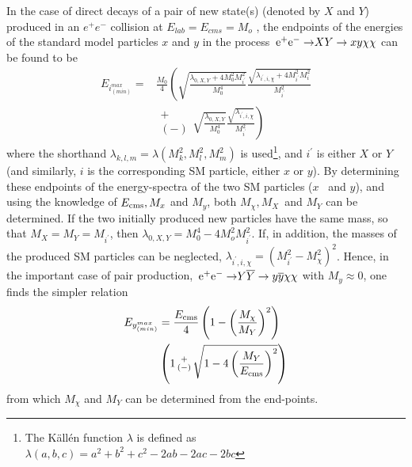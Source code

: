 In the case of direct decays of a pair of new state(s) (denoted by
$X$ and $Y$) produced
in an $e^+e^-$ collision at $E_{lab} = E_{cms} = M_o$ , 
the endpoints
of the energies of the standard model particles $x$ and $y$ 
in the process
$\mbox{$ {\, \mathrm e}^+ {\mathrm e}^- \to $} X Y \rightarrow x y  \chi \chi$
can be found to be
\begin{align}
E_{i^{max}_{(min)}}=&
 \frac{M_0} { 4 } 
\left (  
\sqrt {  \frac{ \lambda_{0,X,Y} + 4  M^2_0 M^2_{i^\prime} } { M^4_0 }}
\frac{ \sqrt {   \lambda_{i^\prime,i,\chi} + 4  M^2_{i^\prime} M^2_{i} }}
 {M^2_{i^\prime} } \right . \nonumber \\ 
  & \left . \begin{smallmatrix}+ \\ (-)\end{smallmatrix} 
\sqrt {  \frac{ \lambda_{0,X,Y} } { M^4_0 }}
\frac{\sqrt { \lambda_{i^\prime,i,\chi} }  } {M^2_{i^\prime} } 
\right )  
\label{eq:searches_genspartendp} 
 \end{align}
where
the shorthand  $\lambda_{k,l,m} = \lambda(M^2_k,M^2_l,M^2_m)$ is used\footnote{
The K\"all\'en function $\lambda$ is defined as $\lambda(a,b,c) = a^2 + b^2 +c^2 -2ab - 2ac - 2bc$}, and 
$i^\prime$ is either $X$ or $Y$ (and similarly, $i$ is the corresponding
SM particle, either $x$ or $y$)\cite{Berggren:2015qua}.
By determining these endpoints of the energy-spectra of the two SM particles ($x$~ and $y$),
and using the knowledge of $\mbox{$ E_{\mathrm{\small cms}} $}, M_x$ and $M_y$, both $M_\chi, M_X$\ and $M_Y$ can 
be determined.
If  the two initially produced new particles have the same mass, 
so that $ M_{X} = M_{Y} = M_{i^\prime}$, 
then  $\lambda_{0,X,Y} = M^4_0 - 4 M^2_o M^2_{i^\prime}$.
If, in addition, the masses of the produced SM particles can be neglected,
$\lambda_{i^\prime,i,\chi} = (M^2_{i^\prime}-M^2_\chi)^2$.
Hence, in the important case of pair production,   
$\eeto Y \bar{Y} \rightarrow y \bar{y} \chi \chi$ with $M_y \approx 0$, one finds the
simpler relation
\begin{align}
E_{y^{max}_{(min)}} &=  
   { \mbox{$ E_{\mathrm{\small cms}} $} \over 4}  \left ( 1 - \left( { M_\chi \over M_{Y} } \right )^2 \right ) \nonumber \\
   &\left ( 1  \begin{smallmatrix}+ \\ (-)\end{smallmatrix}  \sqrt{1 -  4 \left ( {  M_{Y} \over \mbox{$ E_{\mathrm{\small cms}} $}   } \right )^2} \right )
\label{eq:searches_sleptpairendp}
\end{align}
from which $M_\chi$ and $M_Y$ can be determined from the end-points.

